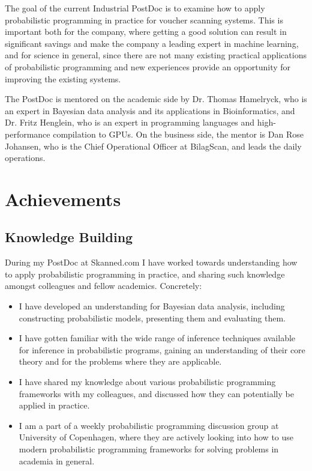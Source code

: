 \documentclass[12pt,a4paper]{article}
\begin{document}
The goal of the current Industrial PostDoc is to examine how to apply
probabilistic programming in practice for voucher scanning systems. This is
important both for the company, where getting a good solution can result in
significant savings and make the company a leading expert in machine learning,
and for science in general, since there are not many existing practical
applications of probabilistic programming and new experiences provide an
opportunity for improving the existing systems.

The PostDoc is mentored on the academic side by Dr. Thomas Hamelryck, who is an
expert in Bayesian data analysis and its applications in Bioinformatics, and
Dr. Fritz Henglein, who is an expert in programming languages and high-performance
compilation to GPUs. On the business side, the mentor is Dan Rose Johansen, who
is the Chief Operational Officer at BilagScan, and leads the daily operations.

\section{Achievements}
\subsection{Knowledge Building} During my PostDoc at Skanned.com I have worked
towards understanding how to apply probabilistic programming in practice, and
sharing such knowledge amongst colleagues and fellow academics.
Concretely:
\begin{itemize}
\item I have developed an understanding for Bayesian data analysis, including
  constructing probabilistic models, presenting them and evaluating them.
\item I have gotten familiar with the wide range of inference techniques
  available for inference in probabilistic programs, gaining an understanding of
  their core theory and for the problems where they are applicable.
\item I have shared my knowledge about various probabilistic programming frameworks with
  my colleagues, and discussed how they can potentially be applied in practice.
\item I am a part of a weekly probabilistic programming discussion group at University of Copenhagen, where they are actively looking into
  how to use modern probabilistic programming frameworks for solving problems in academia in general.
\end{itemize}
\end{document}
